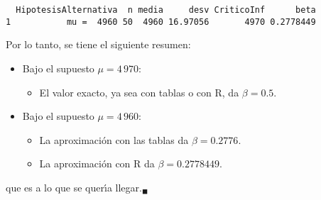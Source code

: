 \begin{solucion}
\begin{enumerate}
\begin{verbatim}
  HipotesisAlternativa  n media     desv CriticoInf      beta
1           mu =  4960 50  4960 16.97056       4970 0.2778449
  \end{verbatim}
  \vspace{-0.5cm}
  Por lo tanto, se tiene el siguiente resumen:
  \begin{itemize}
   \item Bajo el supuesto $\mu = 4\,970$:
   \begin{itemize}
    \item El valor exacto, ya sea con tablas o con R, da $\beta = 0.5$.
   \end{itemize}
   \item Bajo el supuesto $\mu = 4\,960$:
   \begin{itemize}
    \item La aproximaci\'on con las tablas da $\beta = 0.2776$.
    \item La aproximaci\'on con R da $\beta = 0.2778449$.
   \end{itemize}
  \end{itemize}
  que es a lo que se quer\'{\i}a llegar.${}_{\blacksquare}$
 \end{enumerate}
\end{solucion}
